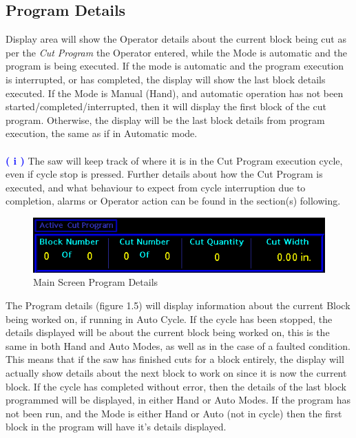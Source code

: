 \subsection{Program Details} Display area will show the Operator details about the current block being cut as per the \textit{Cut Program} the Operator entered, while the Mode is automatic and the program is being executed. If the mode is automatic and the program execution is interrupted, or has completed, the display will show the last block details executed. If the Mode is Manual (Hand), and automatic operation has not been started/completed/interrupted, then it will display the first block of the cut program. Otherwise, the display will be the last block details from program execution, the same as if in Automatic mode. 
\\
\\
\textbf{\LARGE \textcolor{blue}{( i )}} The saw will keep track of where it is in the Cut Program execution cycle, even if cycle stop is pressed. Further details about how the Cut Program is executed, and what behaviour to expect from cycle interruption due to completion, alarms or Operator action can be found in the section(s) following.
\begin{figure}
	\centering
	\includegraphics[width=.95\linewidth]{screen-captures/main-screen-prg-det}
	\caption{Main Screen Program Details}
	\label{fig:main-prg-det}
\end{figure}
The Program details (figure 1.5) will display information about the current Block being worked on, if running in Auto Cycle. If the cycle has been stopped, the details displayed will be about the current block being worked on, this is the same in both Hand and Auto Modes, as well as in the case of a faulted condition. This means that if the saw has finished cuts for a block entirely, the display will actually show details about the next block to work on since it is now the current block. If the cycle has completed without error, then the details of the last block programmed will be displayed, in either Hand or Auto Modes. If the program has not been run, and the Mode is either Hand or Auto (not in cycle) then the first block in the program will have it's details displayed. 
\\
\\
